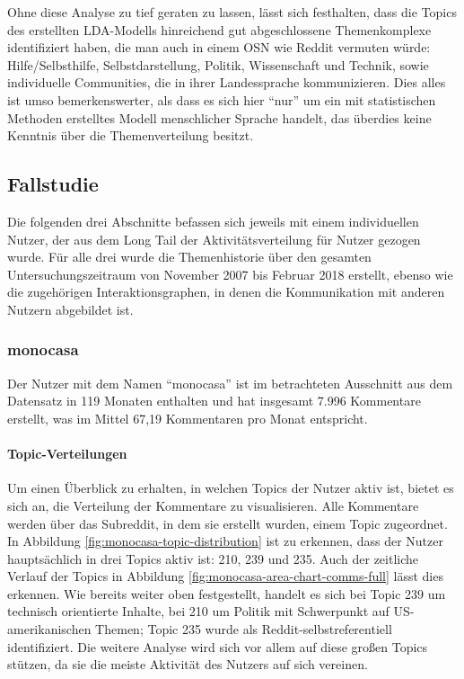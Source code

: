 \documentclass[11pt,a4paper,twoside]{article}
\let\oldpar\paragraph
\renewcommand{\paragraph}{\oldpar*}
\begin{document}
Ohne diese Analyse zu tief geraten zu lassen, lässt sich festhalten,
dass die Topics des erstellten LDA-Modells hinreichend gut
abgeschlossene Themenkomplexe identifiziert haben, die man auch in einem
OSN wie Reddit vermuten würde: Hilfe/Selbsthilfe, Selbstdarstellung,
Politik, Wissenschaft und Technik, sowie individuelle Communities, die
in ihrer Landessprache kommunizieren. Dies alles ist umso
bemerkenswerter, als dass es sich hier \enquote{nur} um ein mit
statistischen Methoden erstelltes Modell menschlicher Sprache handelt,
das überdies keine Kenntnis über die Themenverteilung besitzt.

\hypertarget{fallstudie}{%
\subsection{Fallstudie}\label{fallstudie}}

Die folgenden drei Abschnitte befassen sich jeweils mit einem
individuellen Nutzer, der aus dem Long Tail der Aktivitätsverteilung für
Nutzer gezogen wurde. Für alle drei wurde die Themenhistorie über den
gesamten Untersuchungszeitraum von November 2007 bis Februar 2018
erstellt, ebenso wie die zugehörigen Interaktionsgraphen, in denen die
Kommunikation mit anderen Nutzern abgebildet ist.

\hypertarget{monocasa}{%
\subsubsection{monocasa}\label{monocasa}}

\FloatBarrier

Der Nutzer mit dem Namen \enquote{monocasa} ist im betrachteten
Ausschnitt aus dem Datensatz in 119 Monaten enthalten und hat insgesamt
7.996 Kommentare erstellt, was im Mittel 67,19 Kommentaren pro Monat
entspricht.

\hypertarget{topic-verteilungen}{%
\paragraph{Topic-Verteilungen}\label{topic-verteilungen}}

Um einen Überblick zu erhalten, in welchen Topics der Nutzer aktiv ist,
bietet es sich an, die Verteilung der Kommentare zu visualisieren. Alle
Kommentare werden über das Subreddit, in dem sie erstellt wurden, einem
Topic zugeordnet. In Abbildung \ref{fig:monocasa-topic-distribution} ist
zu erkennen, dass der Nutzer hauptsächlich in drei Topics aktiv ist:
210, 239 und 235. Auch der zeitliche Verlauf der Topics in Abbildung
\ref{fig:monocasa-area-chart-comms-full} lässt dies erkennen. Wie
bereits weiter oben festgestellt, handelt es sich bei Topic 239 um
technisch orientierte Inhalte, bei 210 um Politik mit Schwerpunkt auf
US-amerikanischen Themen; Topic 235 wurde als Reddit-selbstreferentiell
identifiziert. Die weitere Analyse wird sich vor allem auf diese großen
Topics stützen, da sie die meiste Aktivität des Nutzers auf sich
vereinen.
\end{document}
